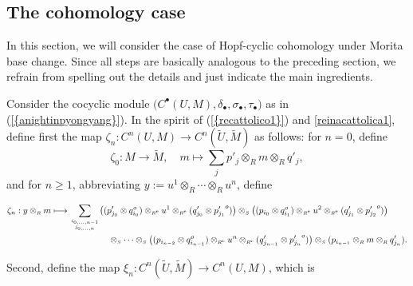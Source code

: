 \documentclass[reqno, a4paper, 10pt]{amsart}
\numberwithin{equation}{section}
\theoremstyle{plain}
\theoremstyle{definition}
\theoremstyle{remark}
\begin{document}
\subsection{The cohomology case}

In this section, we will consider the case of Hopf-cyclic cohomology under Morita base change. Since all steps are basically analogous to the preceding section, we refrain from spelling out the details and just indicate the main ingredients. 

Consider the cocyclic module 
$\big(C^{{\scriptscriptstyle{\bullet}}}(U,M), {\delta}_{{\scriptscriptstyle{\bullet}}}, {\sigma}_{{\scriptscriptstyle{\bullet}}}, \tau_{{\scriptscriptstyle{\bullet}}}\big)$ 
as in {{\rm (}\ref{{anightinpyongyang}}{\rm )}}. In the spirit of {{\rm (}\ref{{recattolico1}}{\rm )}} and \eqref{reinacattolica1},
define first the map $\zeta_n: C^n(U,M) \to C^n(\tilde{U},\tilde{M})$ as follows: for $n=0$, define
$$
\zeta_0: M \longrightarrow \tilde{M}, \quad m \longmapsto \sum_j p'_j \otimes_{{\scriptscriptstyle{R}}} m \otimes_{{\scriptscriptstyle{R}}} q'_j,
$$
and for $n \geq 1$, abbreviating $y:= u^1 \otimes_{{\scriptscriptstyle{R}}} \cdots \otimes_{{\scriptscriptstyle{R}}} u^n$, define 
\begin{footnotesize}
\begin{equation*}
\begin{split}
\zeta_n: 
y \otimes_{{\scriptscriptstyle{R}}} m \longmapsto  \sum_{\scriptscriptstyle{i_{0, \ldots, {n-1}}} \atop \scriptscriptstyle{j_{0, \ldots, n}}} 
 & \big((p'_{j_0} \otimes q_{i_0}^o) \otimes_{{\scriptscriptstyle{{R^{\rm e}}}}} u^1 \otimes_{{\scriptscriptstyle{{R^{\rm e}}}}} (q'_{j_0} \otimes {p'_{j_1}}^o)\big) \otimes_{{\scriptscriptstyle{S}}} 
\big((p_{i_0} \otimes q_{i_1}^o) \otimes_{{\scriptscriptstyle{{R^{\rm e}}}}} u^2 \otimes_{{\scriptscriptstyle{{R^{\rm e}}}}} (q'_{j_1} \otimes {p'_{j_2}}^o)\big)  \\
&\quad \otimes_{{\scriptscriptstyle{S}}}  \cdots \otimes_{{\scriptscriptstyle{S}}} \big((p_{i_{n-2}} \otimes q_{i_{n-1}}^o) \otimes_{{\scriptscriptstyle{{R^{\rm e}}}}} u^{n} \otimes_{{\scriptscriptstyle{{R^{\rm e}}}}} (q'_{j_{n-1}} \otimes {p'_{j_{n}}}^o)\big) \otimes_{{\scriptscriptstyle{S}}} (p_{i_{n-1}} \otimes_{{\scriptscriptstyle{R}}} m \otimes_{{\scriptscriptstyle{R}}} q'_{j_n}).  
\end{split}
\end{equation*}
\end{footnotesize}
Second, define the map $\xi_n: C^n(\tilde{U},\tilde{M}) \to  C^n(U,M)$, which is
\end{document}
